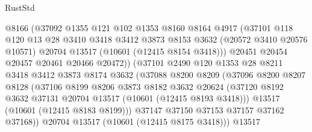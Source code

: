 \begin{lexlean}{RustStd}
\begin{coremodule}
                        @8166
                        (@37092
                          @1355
                          @121
                          @102
                          @1353
                          @8160
                          @8164
                          @4917
                          (@37101
                            @118
                            @120
                            @13
                            @28
                            @3410
                            @3418
                            @3412
                            @3873
                            @8153
                            @3632
                            (@20572 @3410 @20576 @10571)
                            @20704
                            @13517
                            (@10601 (@12415 @8154 @3418)))
                          @20451
                          @20454
                          @20457
                          @20461
                          @20466
                          @20472))
                      (@37101
                        @2490
                        @120
                        @1353
                        @28
                        @8211
                        @3418
                        @3412
                        @3873
                        @8174
                        @3632
                        (@37088
                          @8200
                          @8209
                          (@37096
                            @8200
                            @8207
                            @8128
                            (@37106
                              @8199
                              @8206
                              @3873
                              @8182
                              @3632
                              @20624
                              (@37120
                                @8192
                                @3632
                                @37131
                                @20704
                                @13517
                                (@10601 (@12415 @8193 @3418)))
                              @13517
                              (@10601 (@12415 @8183 @8199)))
                            @37147
                            @37150
                            @37153
                            @37157
                            @37162
                            @37168))
                        @20704
                        @13517
                        (@10601 (@12415 @8175 @3418)))
                      @13517

\end{coremodule}
\end{lexlean}

